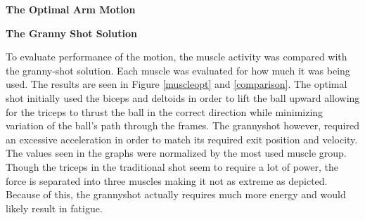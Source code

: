 \begin{multicols}{2}
\begin{center}
\textbf{The Optimal Arm Motion}
\end{center}

\begin{center}
\textbf{The Granny Shot Solution}
\end{center}

To evaluate performance of the motion, the muscle activity was compared with the granny-shot solution.  Each muscle was evaluated for how much it was being used.  The results are seen in Figure \ref{muscleopt} and \ref{comparison}.  The optimal shot initially used the biceps and deltoids in order to lift the ball upward allowing for the triceps to thrust the ball in the correct direction while minimizing variation of the ball's path through the frames.  The grannyshot however, required an excessive acceleration in order to match its required exit position and velocity.  The values seen in the graphs were normalized by the most used muscle group.  Though the triceps in the traditional shot seem to require a lot of power, the force is separated into three muscles making it not as extreme as depicted.  Because of this, the grannyshot actually requires much more energy and would likely result in fatigue.       

  
\end{multicols}

